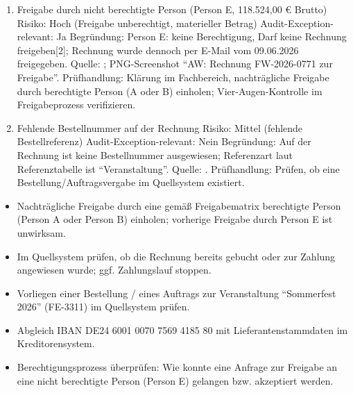 \begin{enumerate}
    \item Freigabe durch nicht berechtigte Person (Person E, 118.524,00 € Brutto)\newline
    Risiko: Hoch (Freigabe unberechtigt, materieller Betrag)\newline
    Audit-Exception-relevant: Ja\newline
    Begründung: Person E: keine Berechtigung, Darf keine Rechnung freigeben[2]; Rechnung wurde dennoch per E-Mail vom 09.06.2026 freigegeben.\newline
    Quelle: ; PNG-Screenshot \enquote{AW: Rechnung FW-2026-0771 zur Freigabe}.\newline
    Prüfhandlung: Klärung im Fachbereich, nachträgliche Freigabe durch berechtigte Person (A oder B) einholen; Vier-Augen-Kontrolle im Freigabeprozess verifizieren.
    \item Fehlende Bestellnummer auf der Rechnung\newline
    Risiko: Mittel (fehlende Bestellreferenz)\newline
    Audit-Exception-relevant: Nein\newline
    Begründung: Auf der Rechnung ist keine Bestellnummer ausgewiesen; Referenzart laut Referenztabelle ist \enquote{Veranstaltung}.\newline
    Quelle: .\newline
    Prüfhandlung: Prüfen, ob eine Bestellung/Auftragsvergabe im Quellsystem existiert.
\end{enumerate}

\begin{itemize}
    \item Nachträgliche Freigabe durch eine gemäß Freigabematrix berechtigte Person (Person A oder Person B) einholen; vorherige Freigabe durch Person E ist unwirksam.
    \item Im Quellsystem prüfen, ob die Rechnung bereits gebucht oder zur Zahlung angewiesen wurde; ggf. Zahlungslauf stoppen.
    \item Vorliegen einer Bestellung / eines Auftrags zur Veranstaltung \enquote{Sommerfest 2026} (FE-3311) im Quellsystem prüfen.
    \item Abgleich IBAN DE24 6001 0070 7569 4185 80 mit Lieferantenstammdaten im Kreditorensystem.
    \item Berechtigungsprozess überprüfen: Wie konnte eine Anfrage zur Freigabe an eine nicht berechtigte Person (Person E) gelangen bzw. akzeptiert werden.
\end{itemize}

